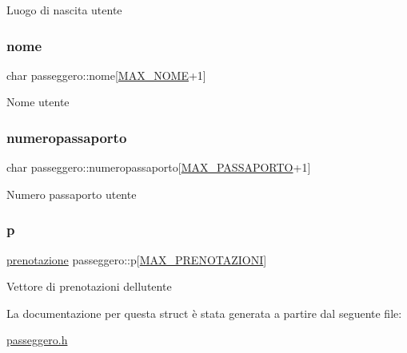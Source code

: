 Luogo di nascita utente \mbox{\label{structpasseggero_ac8f2fda50b9a745032f1ec9bebb452b3}} 
\subsubsection{\texorpdfstring{nome}{nome}}
{\footnotesize\ttfamily char passeggero\+::nome\mbox{[}\hyperlink{define_8h_a650a929b45480c0875d8c814f442b6ac}{M\+A\+X\+\_\+\+N\+O\+ME}+1\mbox{]}}

Nome utente \mbox{\label{structpasseggero_a6f859dc8b0619484607e7e9c5cf7a22a}} 
\subsubsection{\texorpdfstring{numeropassaporto}{numeropassaporto}}
{\footnotesize\ttfamily char passeggero\+::numeropassaporto\mbox{[}\hyperlink{define_8h_a880d733c8de2938a15cf9ddfc72fff2f}{M\+A\+X\+\_\+\+P\+A\+S\+S\+A\+P\+O\+R\+TO}+1\mbox{]}}

Numero passaporto utente \mbox{\label{structpasseggero_aac3260f1220fe7270e1599e819482ed8}} 
\subsubsection{\texorpdfstring{p}{p}}
{\footnotesize\ttfamily \hyperlink{structprenotazione}{prenotazione} passeggero\+::p\mbox{[}\hyperlink{define_8h_a3e58a49def600a497d69859a8860e70a}{M\+A\+X\+\_\+\+P\+R\+E\+N\+O\+T\+A\+Z\+I\+O\+NI}\mbox{]}}

Vettore di prenotazioni dell\textquotesingle{}utente 

La documentazione per questa struct è stata generata a partire dal seguente file\+:\begin{DoxyCompactItemize}
\item 
\hyperlink{passeggero_8h}{passeggero.\+h}\end{DoxyCompactItemize}

